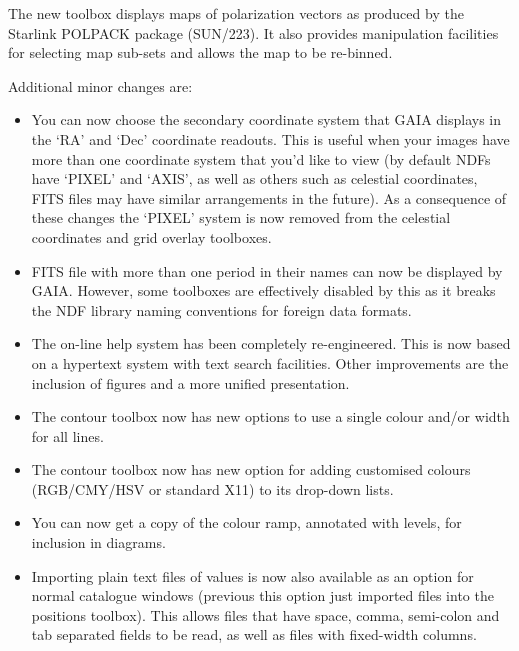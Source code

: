 \documentclass[twoside,11pt]{article}
\newcommand{\xref}[3]{#1}
\renewcommand{\_}{\texttt{\symbol{95}}}
\begin{document}
  The new toolbox displays maps of polarization vectors as produced by
  the Starlink POLPACK package (\xref{SUN/223}{sun223}{}). It also
  provides manipulation facilities for selecting map sub-sets and
  allows the map to be re-binned.

  Additional minor changes are:
  \begin{itemize}
     \item You can now choose the secondary coordinate system that GAIA
       displays in the `RA' and `Dec' coordinate readouts. This is
       useful when your images have more than one coordinate system that
       you'd like to view (by default NDFs have `PIXEL' and `AXIS', as
       well as others such as celestial coordinates, FITS files may have
       similar arrangements in the future). As a consequence of these
       changes the `PIXEL' system is now removed from the celestial
       coordinates and grid overlay toolboxes.

     \item FITS file with more than one period in their names can now be
       displayed by GAIA. However, some toolboxes are effectively
       disabled by this as it breaks the \xref{NDF}{sun33}{} library
       naming conventions for foreign data formats.

     \item The on-line help system has been completely
       re-engineered. This is now based on a hypertext system with text
       search facilities.  Other improvements are the inclusion of
       figures and a more unified presentation.

     \item The contour toolbox now has new options to use a single colour
       and/or width for all lines.

     \item The contour toolbox now has new option for adding customised
       colours (RGB/CMY/HSV or standard X11) to its drop-down lists.

     \item You can now get a copy of the colour ramp, annotated with
       levels, for inclusion in diagrams.

     \item Importing plain text files of values is now also available as an
       option for normal catalogue windows (previous this option just
       imported files into the positions toolbox). This allows files
       that have space, comma, semi-colon and tab separated fields to be
       read, as well as files with fixed-width columns.


\end{itemize}
\end{document}
